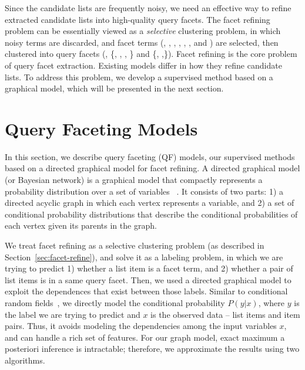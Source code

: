 Since the candidate lists are frequently noisy, we need an effective way to refine extracted candidate lists into high-quality query facets. The facet refining problem can be essentially viewed as a \emph{selective} clustering problem, in which noisy terms are discarded, and facet terms (\eg, , , , , ,  and ) are selected, then clustered into query facets (\eg, \{, , , \} and \{, ,\}). 
Facet refining is the core problem of query facet extraction. Existing models differ in how they refine candidate lists. To address this problem, we develop a supervised method based on a graphical model, which will be presented in the next section.


\section{Query Faceting Models}
\label{sec:facet-gm}
In this section, we describe query faceting (QF) models, our supervised methods based on a directed graphical model for facet refining. A directed graphical model (or Bayesian network) is a graphical model that compactly represents a probability distribution over a set of variables ~\cite{pearl1988probabilistic}. It consists of two parts: 1) a directed acyclic graph in which each vertex represents a variable, and 2) a set of conditional probability distributions that describe the conditional probabilities of each vertex given its parents in the graph.

We treat facet refining as a selective clustering problem (as described in Section~\ref{sec:facet-refine}), and solve it as a labeling problem, in which we are trying to predict 1) whether a list item is a facet term, and 2) whether a pair of list items is in a same query facet. Then, we used a directed graphical model to exploit the dependences that exist between those labels. Similar to conditional random fields~\cite{lafferty2001conditional}, we directly model the conditional probability $P(y|x)$, where $y$ is the label we are trying to predict and $x$ is the observed data -- list items and item pairs. Thus, it avoids modeling the dependencies among the input variables $x$, and can handle a rich set of features. For our graph model, exact maximum a posteriori inference is intractable; therefore, we approximate the results using two algorithms.

